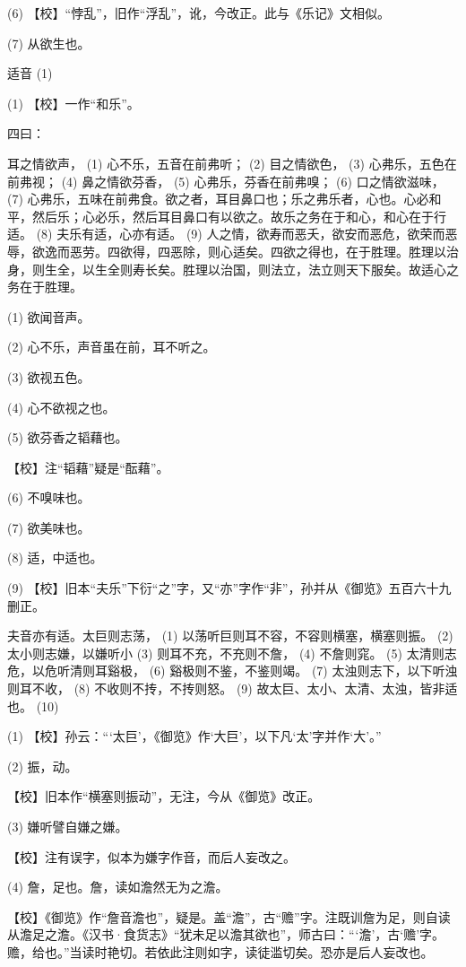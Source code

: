\documentclass[12pt,UTF8]{ctexbook}
\begin{document}
(6) 【校】“悖乱”，旧作“浮乱”，讹，今改正。此与《乐记》文相似。

(7) 从欲生也。





适音 (1)


(1) 【校】一作“和乐”。

四曰：

耳之情欲声， (1) 心不乐，五音在前弗听； (2) 目之情欲色， (3) 心弗乐，五色在前弗视； (4) 鼻之情欲芬香， (5) 心弗乐，芬香在前弗嗅； (6) 口之情欲滋味， (7) 心弗乐，五味在前弗食。欲之者，耳目鼻口也；乐之弗乐者，心也。心必和平，然后乐；心必乐，然后耳目鼻口有以欲之。故乐之务在于和心，和心在于行适。 (8) 夫乐有适，心亦有适。 (9) 人之情，欲寿而恶夭，欲安而恶危，欲荣而恶辱，欲逸而恶劳。四欲得，四恶除，则心适矣。四欲之得也，在于胜理。胜理以治身，则生全，以生全则寿长矣。胜理以治国，则法立，法立则天下服矣。故适心之务在于胜理。

(1) 欲闻音声。

(2) 心不乐，声音虽在前，耳不听之。

(3) 欲视五色。

(4) 心不欲视之也。

(5) 欲芬香之韬藉也。

【校】注“韬藉”疑是“酝藉”。

(6) 不嗅味也。

(7) 欲美味也。

(8) 适，中适也。

(9) 【校】旧本“夫乐”下衍“之”字，又“亦”字作“非”，孙并从《御览》五百六十九删正。

夫音亦有适。太巨则志荡， (1) 以荡听巨则耳不容，不容则横塞，横塞则振。 (2) 太小则志嫌，以嫌听小 (3) 则耳不充，不充则不詹， (4) 不詹则窕。 (5) 太清则志危，以危听清则耳谿极， (6) 谿极则不鉴，不鉴则竭。 (7) 太浊则志下，以下听浊则耳不收， (8) 不收则不抟，不抟则怒。 (9) 故太巨、太小、太清、太浊，皆非适也。 (10)

(1) 【校】孙云：“‘太巨’，《御览》作‘大巨’，以下凡‘太’字并作‘大’。”

(2) 振，动。

【校】旧本作“横塞则振动”，无注，今从《御览》改正。

(3) 嫌听譬自嫌之嫌。

【校】注有误字，似本为嫌字作音，而后人妄改之。

(4) 詹，足也。詹，读如澹然无为之澹。

【校】《御览》作“詹音澹也”，疑是。盖“澹”，古“赡”字。注既训詹为足，则自读从澹足之澹。《汉书·食货志》“犹未足以澹其欲也”，师古曰：“‘澹’，古‘赡’字。赡，给也。”当读时艳切。若依此注则如字，读徒滥切矣。恐亦是后人妄改也。
\end{document}
